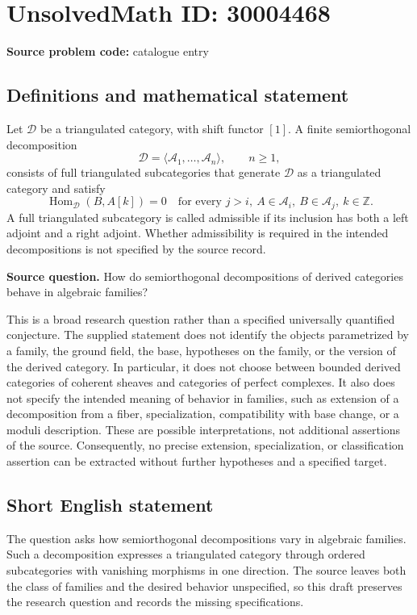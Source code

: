 \documentclass[11pt]{article}
\newcommand{\Z}{\mathbb{Z}}
\begin{document}
\section*{UnsolvedMath ID: 30004468}
\textbf{Source problem code:} catalogue entry
\subsection{Definitions and mathematical statement}
Let \(\mathcal D\) be a triangulated category, with shift functor \([1]\). A finite semiorthogonal decomposition
\[
\mathcal D=\langle\mathcal A_1,\ldots,\mathcal A_n\rangle,
\qquad n\geq 1,
\]
consists of full triangulated subcategories that generate \(\mathcal D\) as a triangulated category and satisfy
\[
\operatorname{Hom}_{\mathcal D}(B,A[k])=0
\quad\text{for every }j>i,\ A\in\mathcal A_i,\ B\in\mathcal A_j,\ k\in\Z.
\]
A full triangulated subcategory is called admissible if its inclusion has both a left adjoint and a right adjoint. Whether admissibility is required in the intended decompositions is not specified by the source record.

\textbf{Source question.} How do semiorthogonal decompositions of derived categories behave in algebraic families?

This is a broad research question rather than a specified universally quantified conjecture. The supplied statement does not identify the objects parametrized by a family, the ground field, the base, hypotheses on the family, or the version of the derived category. In particular, it does not choose between bounded derived categories of coherent sheaves and categories of perfect complexes. It also does not specify the intended meaning of behavior in families, such as extension of a decomposition from a fiber, specialization, compatibility with base change, or a moduli description. These are possible interpretations, not additional assertions of the source. Consequently, no precise extension, specialization, or classification assertion can be extracted without further hypotheses and a specified target.
\subsection{Short English statement}
The question asks how semiorthogonal decompositions vary in algebraic families. Such a decomposition expresses a triangulated category through ordered subcategories with vanishing morphisms in one direction. The source leaves both the class of families and the desired behavior unspecified, so this draft preserves the research question and records the missing specifications.
\end{document}
